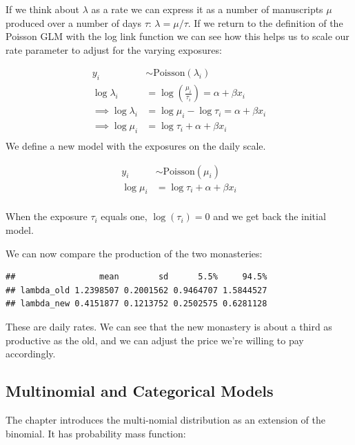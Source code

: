 \documentclass[
]{book}
\begin{document}
If we think about \(\lambda\) as a rate we can express it as a number of manuscripts \(\mu\) produced over a number of days \(\tau\): \(\lambda = \mu/\tau\). If we return to the definition of the Poisson GLM with the log link function we can see how this helps us to scale our rate parameter to adjust for the varying exposures:

\[
\begin{aligned}
y_i &\sim \text{Poisson}(\lambda_i) \\
\log \lambda_i &= \log \left( \frac{\mu_i}{\tau_i} \right)= \alpha + \beta x_i \\
\implies \log \lambda_i &= \log\mu_i - \log\tau_i = \alpha + \beta x_i \\
\implies \log\mu_i &= \log\tau_i + \alpha + \beta x_i \\
\end{aligned}
\]
We define a new model with the exposures on the daily scale.

\[
\begin{aligned}
y_i &\sim \text{Poisson}(\mu_i) \\
\log \mu_i &= \log \tau_i + \alpha + \beta x_i \\
\end{aligned}
\]

When the exposure \(\tau_i\) equals one, \(\log(\tau_i) = 0\) and we get back the initial model.

We can now compare the production of the two monasteries:

\begin{verbatim}
##                 mean        sd      5.5%     94.5%
## lambda_old 1.2398507 0.2001562 0.9464707 1.5844527
## lambda_new 0.4151877 0.1213752 0.2502575 0.6281128
\end{verbatim}

These are daily rates. We can see that the new monastery is about a third as productive as the old, and we can adjust the price we're willing to pay accordingly.

\hypertarget{multinomial-and-categorical-models}{%
\subsection*{Multinomial and Categorical Models}\label{multinomial-and-categorical-models}}

The chapter introduces the multi-nomial distribution as an extension of the binomial. It has probability mass function:
\end{document}
